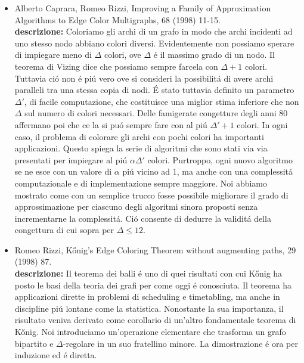 \documentclass[10pt]{article}
\begin{document}
\begin{itemize}
  \vspace{1.4mm}
  \item[] {\sc Alberto Caprara, Romeo Rizzi},  
   \newblock  Improving a Family of Approximation
              Algorithms to Edge Color Multigraphs,
    68 (1998) 11-15.\\
{\bf descrizione:}
Coloriamo gli archi di un grafo
in modo che archi incidenti ad uno stesso nodo
abbiano colori diversi.
Evidentemente non possiamo sperare di impiegare
meno di $\Delta$ colori,
ove $\Delta$ \'e il massimo grado di un nodo.
Il teorema di Vizing dice che
possiamo sempre farcela
con $\Delta+1$ colori.
Tuttavia ci\'o non \'e pi\'u vero
ove si consideri la possibilit\'a di avere archi paralleli
tra una stessa copia di nodi.
\'E stato tuttavia definito
un parametro $\Delta'$,
di facile computazione,
che costituisce una miglior stima inferiore
che non $\Delta$ sul numero di colori necessari.
Delle famigerate congetture
degli anni 80
affermano poi che ce la si pu\'o sempre
fare con al pi\'u $\Delta'+1$ colori.
In ogni caso,
il problema di colorare
gli archi con pochi colori ha importanti applicazioni.
Questo spiega la serie di algoritmi che sono stati
via via presentati per impiegare al pi\'u
$\alpha \Delta'$ colori.
Purtroppo, ogni nuovo algoritmo se ne esce
con un valore di $\alpha$ pi\'u vicino ad 1,
ma anche con una complessit\'a computazionale
e di implementazione sempre maggiore.
Noi abbiamo mostrato come con un semplice trucco fosse possibile
migliorare il grado di approssimazione per ciascuno
degli algoritmi sinora proposti senza incrementarne
la complessit\'a.
Ci\'o consente di dedurre la validit\'a della congettura
di cui sopra per $\Delta\leq 12$.\\

  \vspace{1.4mm}
  \item[] {\sc Romeo Rizzi},
   \newblock  K\H{o}nig's Edge Coloring Theorem without augmenting paths,
    29 (1998) 87.\\
{\bf descrizione:}
Il teorema dei balli \'e uno di
quei risultati con cui K\H{o}nig
ha posto le basi della teoria dei grafi per come oggi \'e conosciuta.
Il teorema ha applicazioni dirette in problemi di scheduling e timetabling,
ma anche in discipline pi\'u lontane come la statistica.
Nonostante la sua importanza, il risultato veniva derivato
come corollario di un'altro fondamentale teorema di K\H{o}nig.
Noi introduciamo  un'operazione elementare che
trasforma un grafo bipartito e $\Delta$-regolare
in un suo fratellino minore.
La dimostrazione \'e ora per induzione
ed \'e diretta.\\


\end{itemize}
\end{document}

